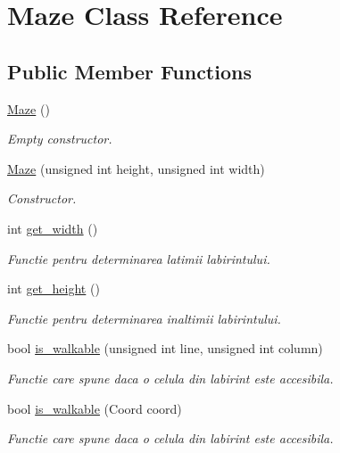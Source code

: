 \hypertarget{classMaze}{
\section{Maze Class Reference}
\label{classMaze}
}
\subsection*{Public Member Functions}
\begin{DoxyCompactItemize}
\item 
\hypertarget{classMaze_a7ecf1da4b9685f97bf3110a8479e724b}{
\hyperlink{classMaze_a7ecf1da4b9685f97bf3110a8479e724b}{Maze} ()}
\label{classMaze_a7ecf1da4b9685f97bf3110a8479e724b}

\begin{DoxyCompactList}\small\item\em Empty constructor. \end{DoxyCompactList}\item 
\hyperlink{classMaze_aefe17a9230004f78133d5cee3fde7ff3}{Maze} (unsigned int height, unsigned int width)
\begin{DoxyCompactList}\small\item\em Constructor. \end{DoxyCompactList}\item 
int \hyperlink{classMaze_a3f9b79edb99a9726da62bc6823ea9149}{get\_\-width} ()
\begin{DoxyCompactList}\small\item\em Functie pentru determinarea latimii labirintului. \end{DoxyCompactList}\item 
int \hyperlink{classMaze_a43a3408e506b2f2463fc985865b3c850}{get\_\-height} ()
\begin{DoxyCompactList}\small\item\em Functie pentru determinarea inaltimii labirintului. \end{DoxyCompactList}\item 
bool \hyperlink{classMaze_ac93538707952b53de27238eea535ee54}{is\_\-walkable} (unsigned int line, unsigned int column)
\begin{DoxyCompactList}\small\item\em Functie care spune daca o celula din labirint este accesibila. \end{DoxyCompactList}\item 
bool \hyperlink{classMaze_a345eaa7ceb15067163e32c3efe04ce4c}{is\_\-walkable} (Coord coord)
\begin{DoxyCompactList}\small\item\em Functie care spune daca o celula din labirint este accesibila. \end{DoxyCompactList}\item 

\end{DoxyCompactItemize}
